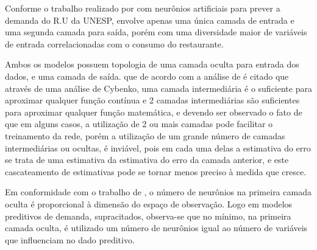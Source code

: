     Conforme  o trabalho realizado por  com neurônios artificiais para prever a demanda do R.U da UNESP, envolve apenas uma única camada de entrada e uma segunda camada para saída, porém com uma diversidade maior de variáveis de entrada correlacionadas com o consumo do restaurante. 
    \begin{figure}[H]
    \end{figure}
    
    Ambos os modelos possuem topologia de uma camada oculta para entrada dos dados, e uma camada de saída. que de acordo com  a análise de   é citado que através de uma análise de Cybenko, uma camada intermediária é o suficiente para aproximar qualquer função contínua e 2 camadas intermediárias são suficientes para aproximar qualquer função matemática, e devendo ser observado o fato de que em alguns casos, a utilização de 2 ou mais camadas pode facilitar o treinamento da rede, porém a utilização de um grande número de camadas intermediárias ou ocultas, é inviável, pois em cada uma delas a estimativa do erro se trata de uma estimativa da estimativa do erro da camada anterior, e este cascateamento de estimativas pode se tornar menos preciso à medida que cresce.
    
    Em conformidade com o trabalho de  , o número de neurônios na primeira camada oculta é proporcional à dimensão do espaço de observação. Logo em modelos preditivos de demanda, supracitados, observa-se que no mínimo, na primeira camada oculta, é utilizado um número de neurônios igual ao número de variáveis que influenciam no dado preditivo.
    
